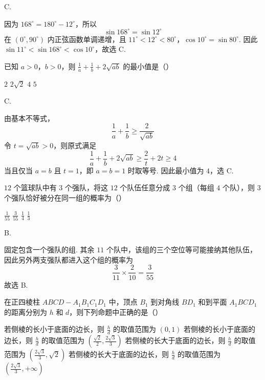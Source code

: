 \begin{answer}
C.
\end{answer}

\begin{solution}
因为 \(168^{\circ}=180^{\circ}-12^{\circ}\)，所以
\[
\sin168^{\circ}=\sin12^{\circ}
\]
在 \((0^{\circ},90^{\circ})\) 内正弦函数单调递增，且
\(11^{\circ}<12^{\circ}<80^{\circ}\)，\(\cos10^{\circ}=\sin80^{\circ}\).
因此 \(\sin11^{\circ}<\sin168^{\circ}<\cos10^{\circ}\)，故选 C.
\end{solution}

\begin{problem}
已知 \(a > 0\)，\(b > 0\)，则 \(\frac{1}{a} + \frac{1}{b} + 2\sqrt{ab}\) 的最小值是（\quad）

\choices
    {\(2\)}
    {\(2\sqrt{2}\)}
    {\(4\)}
    {\(5\)}
\end{problem}

\begin{answer}
C.
\end{answer}

\begin{solution}
由基本不等式，
\[
\frac1a+\frac1b\geqslant \frac{2}{\sqrt{ab}}
\]
令 \(t=\sqrt{ab}>0\)，则原式满足
\[
\frac1a+\frac1b+2\sqrt{ab}
\geqslant \frac2t+2t\geqslant 4
\]
当且仅当 \(a=b\) 且 \(t=1\)，即 \(a=b=1\) 时取等号. 因此最小值为 \(4\)，选 C.
\end{solution}

\begin{problem}
\(12\) 个篮球队中有 \(3\) 个强队，将这 \(12\) 个队伍任意分成 \(3\) 个组（每组 \(4\) 个队），则 \(3\) 个强队恰好被分在同一组的概率为（\quad）

\choices
    {\(\frac{1}{55}\)}
    {\(\frac{3}{55}\)}
    {\(\frac{1}{4}\)}
    {\(\frac{1}{3}\)}
\end{problem}

\begin{answer}
B.
\end{answer}

\begin{solution}
固定包含一个强队的组. 其余 \(11\) 个队中，该组的三个空位等可能接纳其他队伍，因此另外两支强队都进入这个组的概率为
\[
\frac3{11}\times\frac2{10}=\frac3{55}
\]
故选 B.
\end{solution}

\begin{problem}
在正四棱柱 \(ABCD - A_{1}B_{1}C_{1}D_{1}\) 中，顶点 \(B_{1}\) 到对角线 \(BD_{1}\) 和到平面 \(A_{1}BCD_{1}\) 的距离分别为 \(h\) 和 \(d\)，则下列命题中正确的是（\quad）

\choices
    {若侧棱的长小于底面的边长，则 \(\frac{h}{d}\) 的取值范围为 \((0,1)\)}
    {若侧棱的长小于底面的边长，则 \(\frac{h}{d}\) 的取值范围为 \(\left(\frac{\sqrt{2}}{2}, \frac{2\sqrt{3}}{3}\right)\)}
    {若侧棱的长大于底面的边长，则 \(\frac{h}{d}\) 的取值范围为 \(\left(\frac{2\sqrt{3}}{3}, \sqrt{2}\right)\)}
    {若侧棱的长大于底面的边长，则 \(\frac{h}{d}\) 的取值范围为 \(\left(\frac{2\sqrt{3}}{3}, +\infty\right)\)}
\end{problem}

